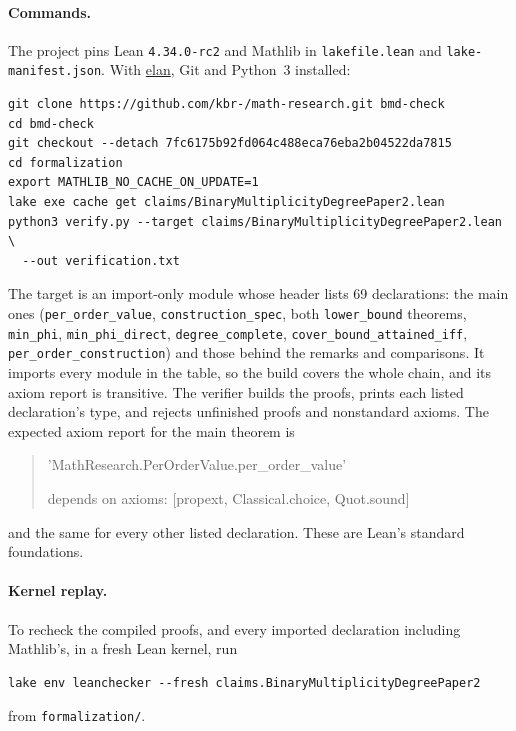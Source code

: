 \paragraph{Commands.} The project pins Lean \texttt{4.34.0-rc2} and Mathlib in
\texttt{lakefile.lean} and \texttt{lake-manifest.json}. With
\href{https://lean-lang.org/install/manual/}{elan}, Git and Python~3 installed:

\begingroup\small
\begin{verbatim}
git clone https://github.com/kbr-/math-research.git bmd-check
cd bmd-check
git checkout --detach 7fc6175b92fd064c488eca76eba2b04522da7815
cd formalization
export MATHLIB_NO_CACHE_ON_UPDATE=1
lake exe cache get claims/BinaryMultiplicityDegreePaper2.lean
python3 verify.py --target claims/BinaryMultiplicityDegreePaper2.lean \
  --out verification.txt
\end{verbatim}
\endgroup

The target is an import-only module whose header lists 69 declarations: the
main ones (\nolinkurl{per_order_value}, \nolinkurl{construction_spec}, both
\nolinkurl{lower_bound} theorems, \nolinkurl{min_phi}, \nolinkurl{min_phi_direct},
\nolinkurl{degree_complete}, \nolinkurl{cover_bound_attained_iff},
\nolinkurl{per_order_construction}) and those behind the remarks and comparisons.
It imports every module in the table, so the build covers the whole chain, and its
axiom report is transitive. The verifier builds the proofs, prints each listed
declaration's type, and rejects unfinished proofs and nonstandard axioms. The
expected axiom report for the main theorem is
\begin{quote}\small\ttfamily
'MathResearch.PerOrderValue.per\_order\_value'\par
depends on axioms: [propext, Classical.choice, Quot.sound]
\end{quote}
and the same for every other listed declaration. These are Lean's standard
foundations.

\paragraph{Kernel replay.} To recheck the compiled proofs, and every imported
declaration including Mathlib's, in a fresh Lean kernel, run
\begingroup\small
\begin{verbatim}
lake env leanchecker --fresh claims.BinaryMultiplicityDegreePaper2
\end{verbatim}
\endgroup
\noindent from \texttt{formalization/}.
